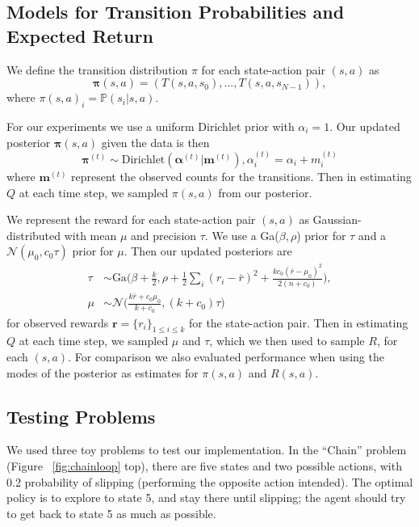 \documentclass[10pt, twocolumn, twoside]{article}
\begin{document}
\subsection{Models for Transition Probabilities and Expected Return}
We define the transition distribution $\pi$ for each state-action pair $(s, a)$ as
\begin{equation*}
\mathbf{\pi}(s, a) = (T(s, a, s_0), ..., T(s, a, s_{N-1})),
\end{equation*}
where $\pi(s, a)_i = \mathbb{P}(s_i| s, a)$.

For our experiments we use a uniform Dirichlet prior with $\alpha_i = 1$.
Our updated posterior $\mathbf{\pi}(s, a)$ given the data is then
\begin{equation*}
\mathbf{\pi}^{(t)} \sim \textrm{Dirichlet}(\mathbf{\alpha}^{(t)}| \mathbf{m}^{(t)}),
\alpha^{(t)}_i = \alpha_i + m_i^{(t)}
\end{equation*}
where $\mathbf{m}^{(t)}$ represent the observed counts for the transitions. Then in estimating $Q$ at each time step, we sampled $\pi(s, a)$ from our posterior.

We represent the reward for each state-action pair $(s, a)$ as Gaussian-
distributed with mean $\mu$ and precision $\tau$. We use a Ga($\beta,\rho$)
prior for $\tau$ and a $\mathcal{N}(\mu_0, c_0\tau)$ prior for $\mu$. Then our
updated posteriors are
\begin{align*}
\tau &\sim \textrm{Ga}\Big(\beta + \frac{k}{2}, \rho + \frac{1}{2}\sum_i(r_i - \bar{r})^2
+ \frac{kc_0(\bar{r}-\mu_0)^2}{2(n+c_0)}\Big),\\
\mu &\sim \mathcal{N}\Big(\frac{k\bar{r} + c_0\mu_0}{k + c_0}, (k+c_0)\tau\Big)
\end{align*}
for observed rewards $\mathbf{r} = \{r_i\}_{1\le i \le k}$ for the state-action pair. Then in estimating $Q$ at each time step, we sampled $\mu$ and $\tau$, which we then used
to sample $R$, for each $(s, a)$.
For comparison we also evaluated performance when using the modes of the posterior as
estimates for $\pi(s, a)$ and $R(s,a)$.

\subsection{Testing Problems}
We used three toy problems to test our implementation. In the ``Chain'' problem
(Figure ~\ref{fig:chainloop} top), there are five states and two possible actions, with 0.2
probability of slipping (performing the opposite action intended). The optimal
policy is to explore to state 5, and stay there until slipping; the agent should try
to get back to state 5 as much as possible.
\end{document}
